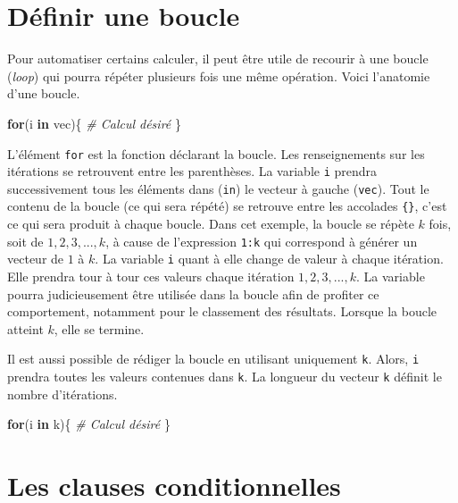 \documentclass[
]{book}
\newenvironment{Shaded}{}{}
\newcommand{\CommentTok}[1]{\textit{#1}}
\newcommand{\ControlFlowTok}[1]{\textbf{#1}}
\newcommand{\NormalTok}[1]{#1}
\begin{document}
\hypertarget{duxe9finir-une-boucle}{%
\section{Définir une boucle}\label{duxe9finir-une-boucle}}

Pour automatiser certains calculer, il peut être utile de recourir à une boucle (\emph{loop}) qui pourra répéter plusieurs fois une même opération. Voici l'anatomie d'une boucle.

\begin{Shaded}
\begin{Highlighting}[]
\ControlFlowTok{for}\NormalTok{(i }\ControlFlowTok{in}\NormalTok{ vec)\{}
  \CommentTok{\# Calcul désiré}
\NormalTok{\}}
\end{Highlighting}
\end{Shaded}

L'élément \texttt{for} est la fonction déclarant la boucle. Les renseignements sur les itérations se retrouvent entre les parenthèses. La variable \texttt{i} prendra successivement tous les éléments dans (\texttt{in}) le vecteur à gauche (\texttt{vec}). Tout le contenu de la boucle (ce qui sera répété) se retrouve entre les accolades \texttt{\{\}}, c'est ce qui sera produit à chaque boucle. Dans cet exemple, la boucle se répète \(k\) fois, soit de \(1,2,3,...,k\), à cause de l'expression \texttt{1:k} qui correspond à générer un vecteur de \(1\) à \(k\). La variable \texttt{i} quant à elle change de valeur à chaque itération. Elle prendra tour à tour ces valeurs chaque itération \(1,2,3,...,k\). La variable pourra judicieusement être utilisée dans la boucle afin de profiter ce comportement, notamment pour le classement des résultats. Lorsque la boucle atteint \(k\), elle se termine.

Il est aussi possible de rédiger la boucle en utilisant uniquement \texttt{k}. Alors, \texttt{i} prendra toutes les valeurs contenues dans \texttt{k}. La longueur du vecteur \texttt{k} définit le nombre d'itérations.

\begin{Shaded}
\begin{Highlighting}[]
\ControlFlowTok{for}\NormalTok{(i }\ControlFlowTok{in}\NormalTok{ k)\{}
  \CommentTok{\# Calcul désiré}
\NormalTok{\}}
\end{Highlighting}
\end{Shaded}

\hypertarget{les-clauses-conditionnelles}{%
\section{Les clauses conditionnelles}\label{les-clauses-conditionnelles}}
\end{document}
